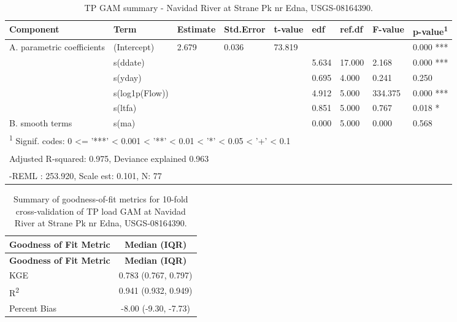 \documentclass[
]{article}
\newenvironment{widestuff}{\begin{table}[h]\begin{adjustwidth}{-4.5cm}{-4.5cm}\centering}{\end{adjustwidth}\end{table}}
\begin{document}
\begin{widestuff}

\caption{TP GAM summary - Navidad River at Strane Pk nr Edna, USGS-08164390.}
\centering
\begin{tabular}[t]{lllllllll}
\toprule
Component & Term & Estimate & Std.Error & t-value & edf & ref.df & F-value & p-value\textsuperscript{1}\\
\midrule
A. parametric coefficients & (Intercept) & 2.679 & 0.036 & 73.819 &  &  &  & 0.000 ***\\
\cmidrule{1-9}
 & s(ddate) &  &  &  & 5.634 & 17.000 & 2.168 & 0.000 ***\\

 & s(yday) &  &  &  & 0.695 & 4.000 & 0.241 & 0.250\\

 & s(log1p(Flow)) &  &  &  & 4.912 & 5.000 & 334.375 & 0.000 ***\\

 & s(ltfa) &  &  &  & 0.851 & 5.000 & 0.767 & 0.018 *\\

\multirow[t]{-5}{*}{\raggedright\arraybackslash B. smooth terms} & s(ma) &  &  &  & 0.000 & 5.000 & 0.000 & 0.568\\
\bottomrule
\multicolumn{9}{l}{\textsuperscript{1} Signif. codes: 0 <= '***' < 0.001 < '**' < 0.01 < '*' < 0.05 < '+' < 0.1}\\
\multicolumn{9}{l}{\textsuperscript{} Adjusted R-squared: 0.975, Deviance explained 0.963}\\
\multicolumn{9}{l}{\textsuperscript{} -REML : 253.920, Scale est: 0.101, N: 77}\\
\end{tabular}
\end{widestuff}

\hypertarget{tbl-TP08164390-CV}{}
\begin{longtable}[]{@{}lc@{}}
\caption{\label{tbl-TP08164390-CV}Summary of goodness-of-fit metrics for
10-fold cross-validation of TP load GAM at Navidad River at Strane Pk nr
Edna, USGS-08164390.}\tabularnewline
\toprule()
\textbf{Goodness of Fit Metric} & \textbf{Median (IQR)} \\
\midrule()
\endfirsthead
\toprule()
\textbf{Goodness of Fit Metric} & \textbf{Median (IQR)} \\
\midrule()
\endhead
KGE & 0.783 (0.767, 0.797) \\
R\textsuperscript{2} & 0.941 (0.932, 0.949) \\
Percent Bias & -8.00 (-9.30, -7.73) \\
\bottomrule()
\end{longtable}
\end{document}
